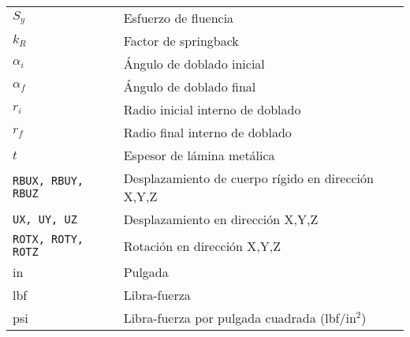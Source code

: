 \begin{table}[h]
\begin{tabular}{p{4cm} p{12cm}}
$ S_y $ &                                     Esfuerzo de fluencia \\
$ k_R $ &                                     Factor de springback \\
$ \alpha_i $ & 								  Ángulo de doblado inicial \\
$ \alpha_f $ & 								  Ángulo de doblado final \\
$ r_i $ & 									  Radio inicial interno de doblado \\
$ r_f $ & 									  Radio final interno de doblado \\
$ t $ &                                       Espesor de lámina metálica \\
{\tt RBUX, RBUY, RBUZ} &                      Desplazamiento de cuerpo rígido en dirección X,Y,Z \\
{\tt UX, UY, UZ} &                            Desplazamiento en dirección X,Y,Z \\
{\tt ROTX, ROTY, ROTZ} & 					  Rotación en dirección X,Y,Z \\
in &                                          Pulgada \\
lbf &                                         Libra-fuerza \\
psi &                                         Libra-fuerza por pulgada cuadrada (lbf/in$^2$) \\

\end{tabular}
\end{table}